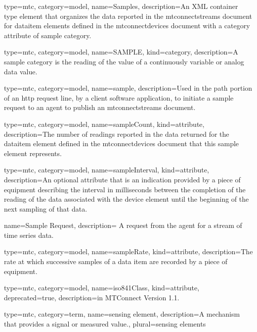 {
  type=mtc,
  category=model,
  name={Samples},
  description={An XML container type element that organizes the data reported in the \gls{mtconnectstreams} document for \gls{dataitem} elements defined in the \gls{mtconnectdevices} document with a \gls{category} attribute of \gls{sample category}.}
}


{
  type=mtc,
  category=model,
  name={SAMPLE},
  kind={category},
  description={A \gls{sample category} is the reading of the value of a continuously variable or analog data value.}
}


{
  type=mtc,
  category=model,
  name={sample},
  description={Used in the path portion of an \gls{http request line}, by a client software application, to initiate a \gls{sample request} to an \gls{agent} to publish an \gls{mtconnectstreams} document.}
}


{
  type=mtc,
  category=model,
  name={sampleCount},
  kind={attribute},
  description={The number of readings reported in the data returned for the \gls{dataitem} element defined in the \gls{mtconnectdevices} document that this \gls{sample} element represents.}
}


{
  type=mtc,
  category=model,
  name={sampleInterval},
  kind={attribute},
  description={An optional attribute that is an indication provided by a piece of equipment describing the interval in milliseconds between the completion of the reading of the data associated with the \gls{device} element until the beginning of the next sampling of that data.}
}


{
  name={Sample Request},
  description= {A request from the \gls{agent} for a stream of time series data.}
}


{
  type=mtc,
  category=model,
  name={sampleRate},
  kind={attribute},
  description={The rate at which successive samples of a data item are recorded by a piece of equipment.}
}

{
  type=mtc,
  category=model,
  name={iso841Class},
  kind={attribute},
  deprecated={true},
  description={\DEPRECATED in MTConnect Version 1.1.}
}


{
  type=mtc,
  category=term,
  name={sensing element},
  description={A mechanism that provides a signal or measured value.},
  plural={sensing elements}
}


